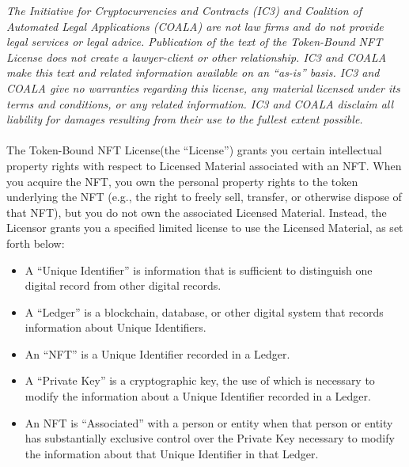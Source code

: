\documentclass{article}
\newcommand{\iccclicense}{Token-Bound NFT License\xspace}
\newcommand{\sect}[1]{\vspace{12pt}\noindent{\strong{#1}}}
\newcommand{\subsect}[1]{\vspace{12pt}\noindent{\em{#1}}}
\begin{document}
\begin{sffamily} 
 
\emph{The Initiative for Cryptocurrencies and Contracts (IC3) and Coalition of Automated Legal Applications (COALA) are not law firms and do not provide legal services or legal advice. Publication of the text of the \iccclicense does not create a lawyer-client or other relationship. IC3 and COALA make this text and related information available on an ``as-is'' basis. IC3 and COALA give no warranties regarding this license, any material licensed under its terms and conditions, or any related information. IC3 and COALA disclaim all liability for damages resulting from their use to the fullest extent possible.}\\\\
The \iccclicense (the ``License'') grants you certain intellectual property rights with respect to Licensed Material associated with an NFT. When you acquire the NFT, you own the personal property rights to the token underlying the NFT (e.g., the right to freely sell, transfer, or otherwise dispose of that  NFT), but you do not own the associated Licensed Material. Instead, the Licensor grants you a specified limited license to use the Licensed Material, as set forth below:

\sect{Definitions}

\subsect{Ledgers and NFTs}


	\begin{itemize}
	\item	A ``Unique Identifier'' is information that is sufficient to distinguish one digital record from other digital records.
		
	\item	A ``Ledger'' is a blockchain, database, or other digital system that records information about Unique Identifiers.
		
	\item	An ``NFT'' is a Unique Identifier recorded in a Ledger.
		
	\item	A ``Private Key'' is a cryptographic key, the use of which is necessary to modify the information about a Unique Identifier recorded in a Ledger.
		
	\item An NFT  is ``Associated'' with a person or entity when that person or entity has substantially exclusive control over the Private Key necessary to modify the information about that Unique Identifier in that Ledger.
		

\end{itemize}
\end{sffamily}
\end{document}

